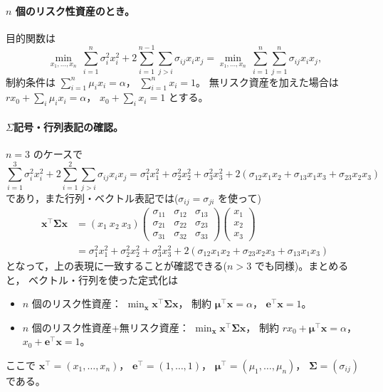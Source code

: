 \paragraph{$n$ 個のリスク性資産のとき。}目的関数は
\[
\min_{x_1,\dots,x_n}\ \sum_{i=1}^{n}\sigma_i^2 x_i^2
+ 2\sum_{i=1}^{n-1}\sum_{j>i}\sigma_{ij}x_ix_j
= \min_{x_1,\dots,x_n}\ \sum_{i=1}^n\sum_{j=1}^n \sigma_{ij}x_ix_j,
\]
制約条件は $\sum_{i=1}^n \mu_i x_i = \alpha$， $\sum_{i=1}^n x_i = 1$。
無リスク資産を加えた場合は $rx_0 + \sum_i\mu_ix_i = \alpha$，
$x_0 + \sum_i x_i = 1$ とする。

\paragraph{$\Sigma$記号・行列表記の確認。}$n=3$ のケースで
\[
\sum_{i=1}^{3}\sigma_i^2x_i^2 + 2\sum_{i=1}^{2}\sum_{j>i}\sigma_{ij}x_ix_j
= \sigma_1^2x_1^2+\sigma_2^2x_2^2+\sigma_3^2x_3^2
+2(\sigma_{12}x_1x_2+\sigma_{13}x_1x_3+\sigma_{23}x_2x_3)
\]
であり，また行列・ベクトル表記では($\sigma_{ij}=\sigma_{ji}$ を使って)
\begin{align*}
\bm{x}^\top\bm{\Sigma}\bm{x}
&= (x_1\ x_2\ x_3)
\begin{pmatrix}\sigma_{11}&\sigma_{12}&\sigma_{13}\\
\sigma_{21}&\sigma_{22}&\sigma_{23}\\
\sigma_{31}&\sigma_{32}&\sigma_{33}\end{pmatrix}
\begin{pmatrix}x_1\\x_2\\x_3\end{pmatrix}\\
&= \sigma_1^2x_1^2+\sigma_2^2x_2^2+\sigma_3^2x_3^2
+2(\sigma_{12}x_1x_2+\sigma_{23}x_2x_3+\sigma_{13}x_1x_3)
\end{align*}
となって，上の表現に一致することが確認できる($n>3$ でも同様)。まとめると，
ベクトル・行列を使った定式化は
\begin{itemize}
\item $n$ 個のリスク性資産：
$\min_{\bm{x}}\bm{x}^\top\bm{\Sigma}\bm{x}$，\quad
制約 $\bm{\mu}^\top\bm{x}=\alpha$， $\bm{e}^\top\bm{x}=1$。
\item $n$ 個のリスク性資産+無リスク資産：
$\min_{\bm{x}}\bm{x}^\top\bm{\Sigma}\bm{x}$，\quad
制約 $rx_0+\bm{\mu}^\top\bm{x}=\alpha$， $x_0+\bm{e}^\top\bm{x}=1$。
\end{itemize}
ここで $\bm{x}^\top=(x_1,\dots,x_n)$， $\bm{e}^\top=(1,\dots,1)$，
$\bm{\mu}^\top=(\mu_1,\dots,\mu_n)$， $\bm{\Sigma}=(\sigma_{ij})$ である。

